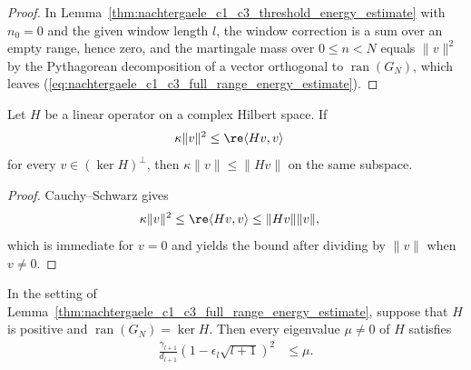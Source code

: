 \begin{proof}
    \leanok
    In Lemma~\ref{thm:nachtergaele_c1_c3_threshold_energy_estimate} with
    $n_0=0$ and the given window length $l$, the window correction is a sum
    over an empty range, hence zero, and the martingale mass over
    $0\leq n<N$ equals $\lVert v\rVert^2$ by the Pythagorean decomposition of a
    vector orthogonal to $\operatorname{ran}(G_N)$, which leaves
    (\ref{eq:nachtergaele_c1_c3_full_range_energy_estimate}).
\end{proof}

\begin{lemma}
    \label{thm:energy_form_to_norm_bound}
    \leanok
    Let $H$ be a linear operator on a complex Hilbert space. If
    \begin{align}
        \kappa\lVert v\rVert^2
         & \leq\re\langle Hv,v\rangle
    \end{align}
    for every $v\in(\ker H)^\perp$, then
    $\kappa\lVert v\rVert\leq\lVert Hv\rVert$ on the same subspace.
\end{lemma}

\begin{proof}
    \leanok
    Cauchy--Schwarz gives
    \begin{align}
        \kappa\lVert v\rVert^2
         & \leq\re\langle Hv,v\rangle
        \leq\lVert Hv\rVert\lVert v\rVert,
    \end{align}
    which is immediate for $v=0$ and yields the bound after dividing by
    $\lVert v\rVert$ when $v\neq0$.
\end{proof}

\begin{lemma}
    \label{thm:nachtergaele_c1_c3_full_range_norm_gap}
    \leanok
    In the setting of
    Lemma~\ref{thm:nachtergaele_c1_c3_full_range_energy_estimate}, suppose
    that $H$ is
    positive and $\operatorname{ran}(G_N)=\ker H$. Then every eigenvalue
    $\mu\neq0$ of $H$ satisfies
    \begin{align}
        \frac{\gamma_{l+1}}{d_{l+1}}
        \left(1-\epsilon_l\sqrt{l+1}\right)^2
         & \leq\mu.
        \label{eq:nachtergaele_c1_c3_full_range_norm_gap}
    \end{align}
\end{lemma}

